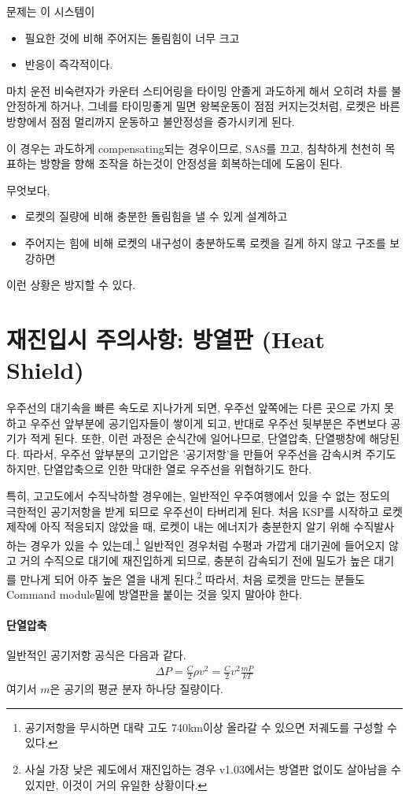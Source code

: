 \documentclass[9pt,twoside,openany]{amsbook}
\begin{document}
문제는 이 시스템이
\begin{itemize}
\item 필요한 것에 비해 주어지는 돌림힘이 너무 크고
\item 반응이 즉각적이다.
\end{itemize}
마치 운전 비숙련자가 카운터 스티어링을 타이밍 안졸게 과도하게 해서 오히려 차를 불안정하게 하거나, 그네를 타이밍좋게 밀면 왕복운동이 점점 커지는것처럼, 로켓은 바른 방향에서 점점 멀리까지 운동하고 불안정성을 증가시키게 된다.

이 경우는 과도하게 compensating되는 경우이므로, SAS를 끄고, 침착하게 천천히 목표하는 방향을 향해 조작을 하는것이 안정성을 회복하는데에 도움이 된다. 

무엇보다, 
\begin{itemize}
\item 로켓의 질량에 비해 충분한 돌림힘을 낼 수 있게 설계하고
\item 주어지는 힘에 비해 로켓의 내구성이 충분하도록 로켓을 길게 하지 않고 구조를 보강하면
\end{itemize}
이런 상황은 방지할 수 있다.

\section{재진입시 주의사항: 방열판 (Heat Shield)}
우주선의 대기속을 빠른 속도로 지나가게 되면, 우주선 앞쪽에는 다른 곳으로 가지 못하고 우주선 앞부분에 공기입자들이 쌓이게 되고, 반대로 우주선 뒷부분은 주변보다 공기가 적게 된다. 또한, 이런 과정은 순식간에 일어나므로, 단열압축, 단열팽창에 해당된다. 따라서, 우주선 앞부분의 고기압은 '공기저항'을 만들어 우주선을 감속시켜 주기도 하지만, 단열압축으로 인한 막대한 열로 우주선을 위협하기도 한다.

특히, 고고도에서 수직낙하할 경우에는, 
일반적인 우주여행에서 있을 수 없는 정도의 극한적인 공기저항을 받게 되므로 우주선이 타버리게 된다. 
처음 KSP를 시작하고 로켓제작에 아직 적응되지 않았을 때, 
로켓이 내는 에너지가 충분한지 알기 위해 수직발사 하는 경우가 
있을 수 있는데,\footnote{공기저항을 무시하면 대략 고도 740km이상 올라갈 수 있으면 저궤도를 구성할 수 있다.}
일반적인 경우처럼 수평과 가깝게 대기권에 들어오지 않고 거의 수직으로 대기에 재진입하게 되므로,
충분히 감속되기 전에 밀도가 높은 대기를 만나게 되어 아주 높은 열을 
내게 된다.\footnote{사실 가장 낮은 궤도에서 재진입하는 경우 v1.03에서는 방열판 없이도 살아남을 수 있지만, 
이것이 거의 유일한 상황이다.} 
따라서, 처음 로켓을 만드는 분들도 Command module밑에 방열판을 붙이는 것을 잊지 말아야 한다.

\paragraph{단열압축}
일반적인 공기저항 공식은 다음과 같다.
\begin{align}
\Delta P = \frac{C}{2} \rho v^2 = \frac{C}{2} v^2\frac{m P}{kT}
\end{align}
여기서 $m$은 공기의 평균 분자 하나당 질량이다.
\end{document}
